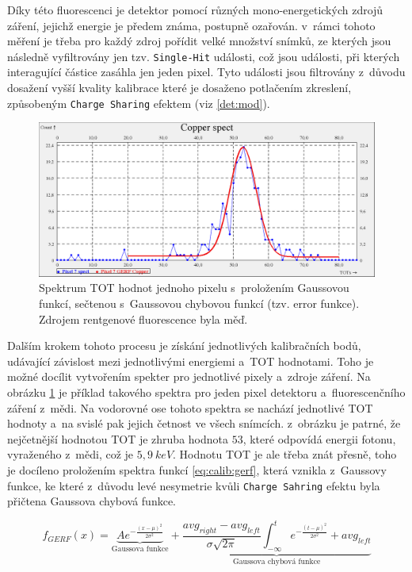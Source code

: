 Díky této fluorescenci je detektor pomocí různých mono-energetických zdrojů záření, jejichž energie je předem známa, postupně ozařován. v~rámci tohoto měření je třeba pro každý zdroj pořídit velké množství snímků, ze kterých jsou následně vyfiltrovány jen tzv. \texttt{Single-Hit} události, což jsou události, při kterých interagující částice zasáhla jen jeden pixel. Tyto události jsou filtrovány z~důvodu dosažení vyšší kvality kalibrace které je dosaženo potlačením zkreslení, způsobeným \texttt{Charge Sharing} efektem (viz \ref{det:mod}).

\begin{figure}[th]
	\begin{center}
		\includegraphics[width=14cm]{figures/calib_gerf.png}
		\caption{Spektrum TOT hodnot jednoho pixelu s~proložením Gaussovou funkcí, sečtenou s~Gaussovou chybovou funkcí (tzv. error funkce). Zdrojem rentgenové fluorescence byla měď.}
		\label{fig:calib:gerf}
	\end{center}
\end{figure}

Dalším krokem tohoto procesu je získání jednotlivých kalibračních bodů, udávající závislost mezi jednotlivými energiemi a~TOT hodnotami. Toho je možné docílit vytvořením spekter pro jednotlivé pixely a~zdroje záření. Na obrázku \ref{fig:calib:gerf} je příklad takového spektra pro jeden pixel detektoru a~fluorescenčního záření z~mědi. Na vodorovné ose tohoto spektra se nachází jednotlivé TOT hodnoty a~na svislé pak jejich četnost ve všech snímcích. z~obrázku je patrné, že nejčetnější hodnotou TOT je zhruba hodnota $53$, které odpovídá energii fotonu, vyraženého z~mědi, což je $5,9~keV$. Hodnotu TOT je ale třeba znát přesně, toho je docíleno proložením spektra funkcí \ref{eq:calib:gerf}, která vznikla z~Gaussovy funkce, ke které z~důvodu levé nesymetrie kvůli \texttt{Charge Sahring} efektu byla přičtena Gaussova chybová funkce. 

\begin{equation}\label{eq:calib:gerf}
	f_{GERF}(x) = \underbrace{Ae^{ -\frac{(x-\mu)^2}{2\sigma^2} }}_{\text{Gaussova funkce}} +
	\underbrace{ \frac{avg_{right} - avg_{left}}{\sigma\sqrt{2\pi}} \int_{-\infty}^t e^{ -\frac{(t-\mu)^2}{2\sigma^2} } + avg_{left}}_{\text{Gaussova chybová funkce}}
\end{equation}

